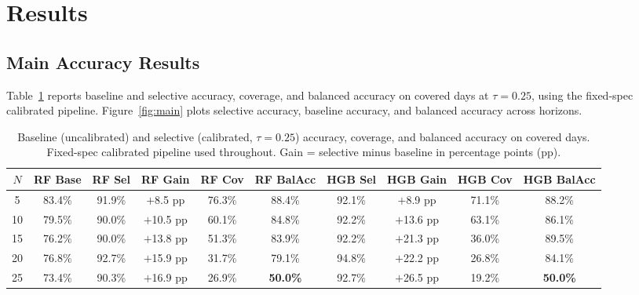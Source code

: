 \documentclass[12pt]{article}
\begin{document}
\section{Results}
\label{sec:results}

\subsection{Main Accuracy Results}
\label{sec:main}

Table~\ref{tab:main} reports baseline and selective accuracy, coverage, and balanced accuracy on covered days at $\tau = 0.25$, using the fixed-spec calibrated pipeline. Figure~\ref{fig:main} plots selective accuracy, baseline accuracy, and balanced accuracy across horizons.

\begin{table}[H]
\centering
\caption{Baseline (uncalibrated) and selective (calibrated, $\tau = 0.25$) accuracy, coverage, and balanced accuracy on covered days. Fixed-spec calibrated pipeline used throughout. Gain = selective minus baseline in percentage points (pp).}
\label{tab:main}
\small
\begin{tabular}{cccccccccc}
\toprule
$N$ & RF Base & RF Sel & RF Gain & RF Cov & RF BalAcc & HGB Sel & HGB Gain & HGB Cov & HGB BalAcc \\
\midrule
5  & 83.4\% & 91.9\% & $+$8.5 pp & 76.3\% & 88.4\% & 92.1\% & $+$8.9 pp & 71.1\% & 88.2\% \\
10 & 79.5\% & 90.0\% & $+$10.5 pp & 60.1\% & 84.8\% & 92.2\% & $+$13.6 pp & 63.1\% & 86.1\% \\
15 & 76.2\% & 90.0\% & $+$13.8 pp & 51.3\% & 83.9\% & 92.2\% & $+$21.3 pp & 36.0\% & 89.5\% \\
20 & 76.8\% & 92.7\% & $+$15.9 pp & 31.7\% & 79.1\% & 94.8\% & $+$22.2 pp & 26.8\% & 84.1\% \\
25 & 73.4\% & 90.3\% & $+$16.9 pp & 26.9\% & \textbf{50.0\%} & 92.7\% & $+$26.5 pp & 19.2\% & \textbf{50.0\%} \\
\bottomrule
\end{tabular}
\end{table}
\end{document}
